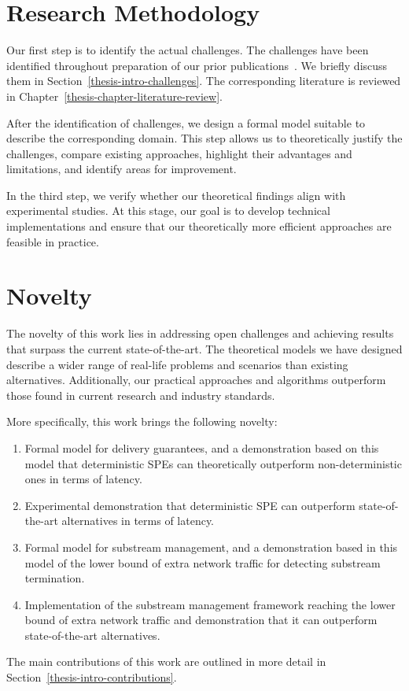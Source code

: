 \section{Research Methodology}

Our first step is to identify the actual challenges. The challenges have been identified throughout preparation of our prior publications~\cite{we2018adbis, trofimov2018consistency, we2018seim, we2018beyondmr, we2019debs, webirte, thepaper, 10.1145/3524860.3539809, trofimov2023bounding}. We briefly discuss them in Section~\ref{thesis-intro-challenges}. The corresponding literature is reviewed in Chapter~\ref{thesis-chapter-literature-review}.

After the identification of challenges, we design a formal model suitable to describe the corresponding domain. This step allows us to theoretically justify the challenges, compare existing approaches, highlight their advantages and limitations, and identify areas for improvement.

In the third step, we verify whether our theoretical findings align with experimental studies. At this stage, our goal is to develop technical implementations and ensure that our theoretically more efficient approaches are feasible in practice.

\section{Novelty}

The novelty of this work lies in addressing open challenges and achieving results that surpass the current state-of-the-art. The theoretical models we have designed describe a wider range of real-life problems and scenarios than existing alternatives. Additionally, our practical approaches and algorithms outperform those found in current research and industry standards. 

More specifically, this work brings the following novelty:
\begin{enumerate}
    \item Formal model for delivery guarantees, and a demonstration based on this model that deterministic SPEs can theoretically outperform non-deterministic ones in terms of latency.
    \item Experimental demonstration that deterministic SPE can outperform state-of-the-art alternatives in terms of latency.
    \item Formal model for substream management, and a demonstration based in this model of the lower bound of extra network traffic for detecting substream termination.
    \item Implementation of the substream management framework reaching the lower bound of extra network traffic and demonstration that it can outperform state-of-the-art alternatives.
\end{enumerate}
The main contributions of this work are outlined in more detail in Section~\ref{thesis-intro-contributions}.

